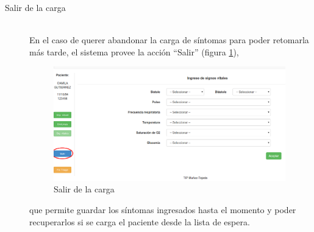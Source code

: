 \begin{description}
\item[Salir de la carga]\mbox{} \\
En el caso de querer abandonar la carga de síntomas para poder retomarla más tarde, el sistema provee la acción ``Salir'' (figura \ref{fig:fin}),
\begin{figure}
\centerline{\includegraphics[width=0.99\textwidth]{fin.png}}
\caption{Salir de la carga} \label{fig:fin}
\end{figure}
que permite guardar los síntomas ingresados hasta el momento y poder recuperarlos si se carga el paciente desde la lista de espera.


\end{description}